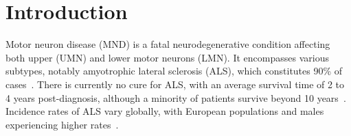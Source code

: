 \chapter{Introduction}
\label{introduction}

%

Motor neuron disease (MND) is a fatal neurodegenerative condition affecting both upper (UMN) and lower motor neurons (LMN).
It encompasses various subtypes, notably amyotrophic lateral sclerosis (ALS), which constitutes 90\% of cases~\cite{filippiMotorNeuronDiseases2015}.
There is currently no cure for ALS, with an average survival time of 2 to 4 years post-diagnosis, although a minority of patients survive beyond 10 years~\cite{swinnenPhenotypicVariabilityAmyotrophic2014,goutmanRecentAdvancesDiagnosis2022a,pupilloLongtermSurvivalAmyotrophic2014}.
Incidence rates of ALS vary globally, with European populations and males experiencing higher rates~\cite{marinVariationWorldwideIncidence2017,fontanaTimetrendEvolutionDeterminants2021}.


